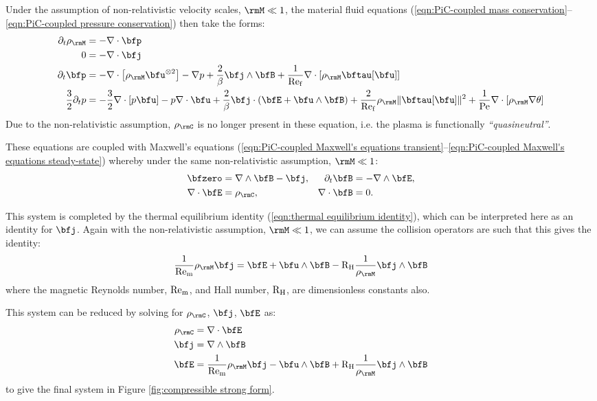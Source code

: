     Under the assumption of non-relativistic velocity scales, $\rmM  \ll  1$, the material fluid equations (\ref{eqn:PiC-coupled mass conservation}--\ref{eqn:PiC-coupled pressure conservation}) then take the forms:
    \begin{align}
         \partial_{t}\rho_{\rmM}  &=  - \nabla\cdot\bfp  \\
                               0  &=  - \nabla\cdot\bfj  \\
                \partial_{t}\bfp  &=  - \nabla\cdot\left[\rho_{\rmM}\bfu^{\otimes 2}\right] - \nabla p + \frac{2}{\beta}\bfj\wedge\bfB + \frac{1}{\rmRef}\nabla\cdot[\rho_{\rmM}\bftau[\bfu]]  \\
        \frac{3}{2}\partial_{t}p  &=  - \frac{3}{2}\nabla\cdot[p\bfu] - p\nabla\cdot\bfu + \frac{2}{\beta}\bfj\cdot(\bfE + \bfu\wedge\bfB) + \frac{2}{\rmRef}\rho_{\rmM}\|\bftau[\bfu]\|^{2} + \frac{1}{\rmPe}\nabla\cdot[\rho_{\rmM}\nabla\theta]
    \end{align}
    Due to the non-relativistic assumption, $\rho_{\rmC}$ is no longer present in these equation, i.e. the plasma is functionally \emph{``quasineutral''}.

    These equations are coupled with Maxwell's equations (\ref{eqn:PiC-coupled Maxwell's equations transient}--\ref{eqn:PiC-coupled Maxwell's equations steady-state}) whereby under the same non-relativistic assumption, $\rmM  \ll  1$:
    \begin{align}
                 \bfzero  &=  \nabla\wedge\bfB - \bfj,  &
        \partial_{t}\bfB  &=  - \nabla\wedge\bfE,  \\
         \nabla\cdot\bfE  &=  \rho_{\rmC},  &
         \nabla\cdot\bfB  &=  0.
    \end{align}
    
    This system is completed by the thermal equilibrium identity (\ref{eqn:thermal equilibrium identity}), which can be interpreted here as an identity for $\bfj$. Again with the non-relativistic assumption, $\rmM  \ll  1$, we can assume the collision operators are such that this gives the identity:
    \begin{equation}
        \frac{1}{\rmRem}\rho_{\rmM}\bfj  =  \bfE + \bfu\wedge\bfB - \rmRH\frac{1}{\rho_{\rmM}}\bfj\wedge\bfB
    \end{equation}
    where the magnetic Reynolds number, $\mathrm{Re}_{\mathrm{m}}$, and Hall number, $\mathrm{R}_{\mathrm{H}}$, are dimensionless constants also.

    This system can be reduced by solving for $\rho_{\rmC}$, $\bfj$, $\bfE$ as:
    \begin{align}
        \rho_{\rmC}  &=  \nabla\cdot\bfE  \\
               \bfj  &=  \nabla\wedge\bfB  \\
               \bfE  &=  \frac{1}{\rmRem}\rho_{\rmM}\bfj - \bfu\wedge\bfB + \rmRH\frac{1}{\rho_{\rmM}}\bfj\wedge\bfB
    \end{align}
    to give the final system in Figure \ref{fig:compressible strong form}.

